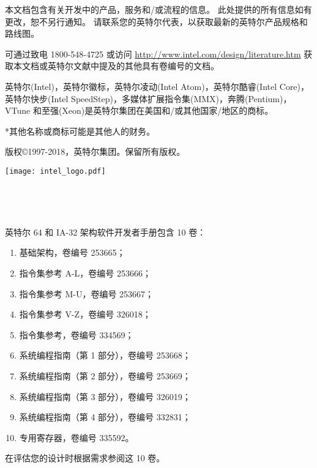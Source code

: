 本文档包含有关开发中的产品，服务和/或流程的信息。 此处提供的所有信息如有更改，恕不另行通知。 请联系您的英特尔代表，以获取最新的英特尔产品规格和路线图。

可通过致电 1800-548-4725 或访问 \url{http://www.intel.com/design/literature.htm} 获取本文档或英特尔文献中提及的其他具有卷编号的文档。

英特尔(Intel)，英特尔徽标，英特尔凌动(Intel Atom)，英特尔酷睿(Intel Core)，英特尔快步(Intel SpeedStep)，多媒体扩展指令集(MMX)，奔腾(Pentium)，VTune 和至强(Xeon)是英特尔集团在美国和/或其他国家/地区的商标。

*其他名称或商标可能是其他人的财务。

版权\copyright 1997-2018，英特尔集团。保留所有版权。

\newpage
\thispagestyle{empty}
\begin{flushright}
\vspace*{-1.5cm}
\texttt{[image: intel\_logo.pdf]}

\vspace*{2cm}

{\Huge \textbf{}\\\textbf{}}

\vspace{0.5cm}
{\LARGE {}\\
}
\end{flushright}

\vspace*{2cm}

\noindent{}英特尔 64 和 IA-32 架构软件开发者手册包含 10 卷：
\begin{enumerate}
	\item 基础架构，卷编号 253665；
	\item 指令集参考 A-L，卷编号 253666；
	\item 指令集参考 M-U，卷编号 253667；
	\item 指令集参考 V-Z，卷编号 326018；
	\item 指令集参考，卷编号 334569；
	\item 系统编程指南（第 1 部分），卷编号 253668；
	\item 系统编程指南（第 2 部分），卷编号 253669；
	\item 系统编程指南（第 3 部分），卷编号 326019；
	\item 系统编程指南（第 4 部分），卷编号 332831；
	\item 专用寄存器，卷编号 335592。
\end{enumerate}
在评估您的设计时根据需求参阅这 10 卷。

